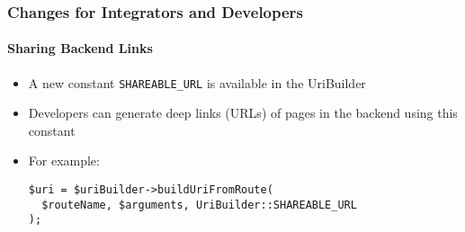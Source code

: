 %

\begin{frame}[fragile]
	\frametitle{Changes for Integrators and Developers}
	\framesubtitle{Sharing Backend Links}


	\begin{itemize}
		\item A new constant \texttt{SHAREABLE\_URL} is available in the UriBuilder
		\item Developers can generate deep links (URLs) of pages in the backend using
			this constant
		\item For example:
\begin{lstlisting}
$uri = $uriBuilder->buildUriFromRoute(
  $routeName, $arguments, UriBuilder::SHAREABLE_URL
);
\end{lstlisting}

	\end{itemize}

\end{frame}

